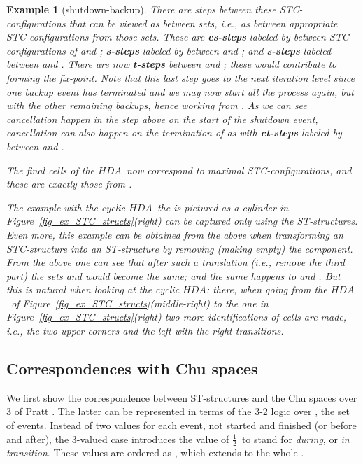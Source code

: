 \documentclass[submission,copyright,creativecommons]{eptcs}
\newtheorem{example}[theorem]{Example}
\newcounter{case}
\newcommand\executing{\ensuremath{\frac{1}{2}}}
\newcommand\HDA{\ensuremath{\mathit{HDA}}}
\begin{document}
\begin{example}[shutdown-backup]
There are steps between these STC-configurations that can be viewed as between  sets, i.e., as between appropriate STC-configurations from those sets. These are \textbf{cs-steps} labeled by  between STC-configurations of  and ; \textbf{s-steps} labeled by  between  and ; and \textbf{s-steps} labeled  between  and .
There are now \textbf{t-steps} between  and ; these would contribute to forming the fix-point. Note that this last step goes to the next iteration level since one backup event has terminated and we may now start all the process again, but with the other remaining backups, hence working from .
As we can see cancellation happen in the step above on the start of the shutdown event, cancellation can also happen on the termination of  as with \textbf{ct-steps} labeled by  between  and .

The \textit{final} cells of the \HDA\ now correspond to \textit{maximal} STC-configurations, and these are exactly those from .

The example with the cyclic \HDA\ the is pictured as a cylinder in Figure~\ref{fig_ex_STC_structs}(right) can be captured only using the ST-structures. Even more, this example can be obtained from the above when transforming an STC-structure into an ST-structure by removing (making empty) the  component. From the above one can see that after such a translation (i.e., remove the third part) the sets  and  would become the same; and the same happens to  and . But this is natural when looking at the cyclic \HDA: there, when going from the \HDA\ of Figure~\ref{fig_ex_STC_structs}(middle-right) to the one in Figure~\ref{fig_ex_STC_structs}(right) two more identifications of cells are made, i.e., the two upper corners and the left with the right transitions.
\end{example}


\subsection{Correspondences with Chu spaces}

We first show the correspondence between ST-structures and the Chu spaces over 3 of Pratt \cite{Pratt00HDArev}. The latter can be represented in terms of the 3-2 logic over , the set of events. Instead of two values for each event,  not started and  finished (or before and after), the 3-valued case introduces the value of \executing\ to stand for \textit{during}, or \textit{in transition}. These values are ordered as , which extends to the whole .
\end{document}
